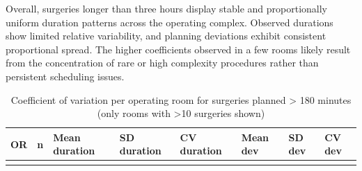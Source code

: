 \documentclass[
]{article}
\begin{document}
Overall, surgeries longer than three hours display stable and
proportionally uniform duration patterns across the operating complex.
Observed durations show limited relative variability, and planning
deviations exhibit consistent proportional spread. The higher
coefficients observed in a few rooms likely result from the
concentration of rare or high complexity procedures rather than
persistent scheduling issues.

\begin{longtable}[]{@{}
  >{\centering\arraybackslash}p{}
  >{\centering\arraybackslash}p{}
  >{\centering\arraybackslash}p{}
  >{\centering\arraybackslash}p{}
  >{\centering\arraybackslash}p{}
  >{\centering\arraybackslash}p{}
  >{\centering\arraybackslash}p{}
  >{\centering\arraybackslash}p{}@{}}
\caption{Coefficient of variation per operating room for surgeries
planned \textgreater{} 180 minutes (only rooms with \textgreater10
surgeries shown) \label{tab:cv_room_over180}}\tabularnewline
\toprule\noalign{}
\begin{minipage}[b]{\linewidth}\centering
OR
\end{minipage} & \begin{minipage}[b]{\linewidth}\centering
n
\end{minipage} & \begin{minipage}[b]{\linewidth}\centering
Mean duration
\end{minipage} & \begin{minipage}[b]{\linewidth}\centering
SD duration
\end{minipage} & \begin{minipage}[b]{\linewidth}\centering
CV duration
\end{minipage} & \begin{minipage}[b]{\linewidth}\centering
Mean dev
\end{minipage} & \begin{minipage}[b]{\linewidth}\centering
SD dev
\end{minipage} & \begin{minipage}[b]{\linewidth}\centering
CV dev
\end{minipage} \\
\midrule\noalign{}
\endfirsthead

\end{longtable}
\end{document}
